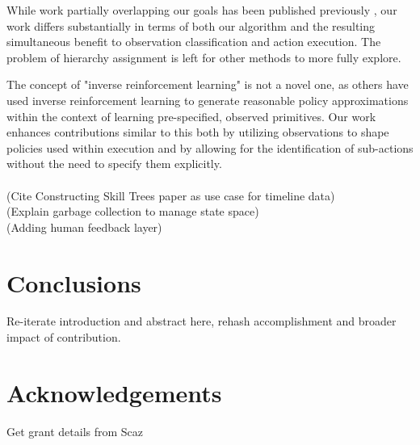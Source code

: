 \documentclass[letterpaper]{article}
\begin{document}
While work partially overlapping our goals has been published previously \cite{LearningBehaviorFusion}, 
our work differs substantially in terms of both our algorithm and the resulting simultaneous benefit to
observation classification and action execution. The problem of hierarchy assignment is left for other
methods to more fully explore.

The concept of "inverse reinforcement learning" is not a novel one, 
as others \cite{InverseRL} have used inverse reinforcement learning
to generate reasonable policy approximations within the context of learning 
pre-specified, observed primitives. Our work enhances contributions similar to this both by utilizing
observations to shape policies used within execution and by allowing for the identification of sub-actions
without the need to specify them explicitly.\\ 
\\
	(Cite Constructing Skill Trees paper as use case for timeline data)\\
	(Explain garbage collection to manage state space)\\
	(Adding human feedback layer)\\

\section{Conclusions}
Re-iterate introduction and abstract here, rehash accomplishment and broader impact of contribution.

\label{sec:conclusions}


\section{Acknowledgements}
\label{sec:acknowledgements}
Get grant details from Scaz



\end{document}
